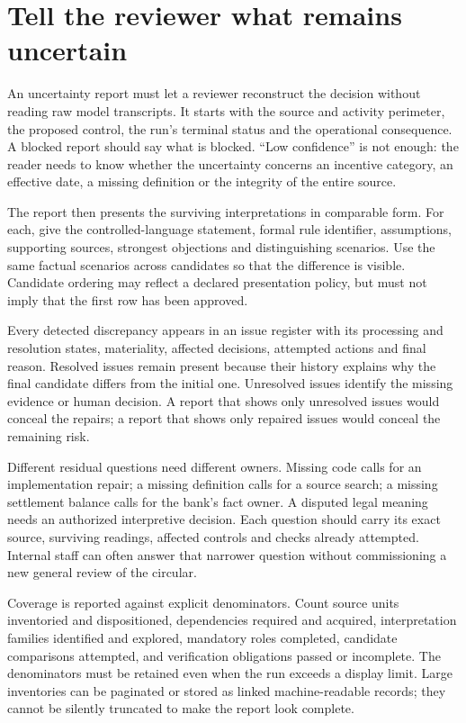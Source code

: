 \documentclass[12pt,a4paper,oneside,openany]{book}
\begin{document}
\section{Tell the reviewer what remains uncertain}
\label{merge:M06:22}


An uncertainty report must let a reviewer reconstruct the decision without
reading raw model transcripts. It starts with the source and activity perimeter,
the proposed control, the run's terminal status and the operational consequence.
A blocked report should say what is blocked. ``Low confidence'' is not enough:
the reader needs to know whether the uncertainty concerns an incentive category,
an effective date, a missing definition or the integrity of the entire source.

The report then presents the surviving interpretations in comparable form. For
each, give the controlled-language statement, formal rule identifier, assumptions,
supporting sources, strongest objections and distinguishing scenarios. Use the
same factual scenarios across candidates so that the difference is visible.
Candidate ordering may reflect a declared presentation policy, but must not imply
that the first row has been approved.

Every detected discrepancy appears in an issue register with its processing and
resolution states, materiality, affected decisions, attempted actions and final
reason. Resolved issues remain present because their history explains why the
final candidate differs from the initial one. Unresolved issues identify the
missing evidence or human decision. A report that shows only unresolved issues
would conceal the repairs; a report that shows only repaired issues would conceal
the remaining risk.

Different residual questions need different owners. Missing code calls for an
implementation repair; a missing definition calls for a source search; a missing
settlement balance calls for the bank's fact owner. A disputed legal meaning
needs an authorized interpretive decision. Each question should carry its exact
source, surviving readings, affected controls and checks already attempted.
Internal staff can often answer that narrower question without commissioning a
new general review of the circular.

Coverage is reported against explicit denominators. Count source units inventoried
and dispositioned, dependencies required and acquired, interpretation families
identified and explored, mandatory roles completed, candidate comparisons
attempted, and verification obligations passed or incomplete. The denominators
must be retained even when the run exceeds a display limit. Large inventories
can be paginated or stored as linked machine-readable records; they cannot be
silently truncated to make the report look complete.
\end{document}
